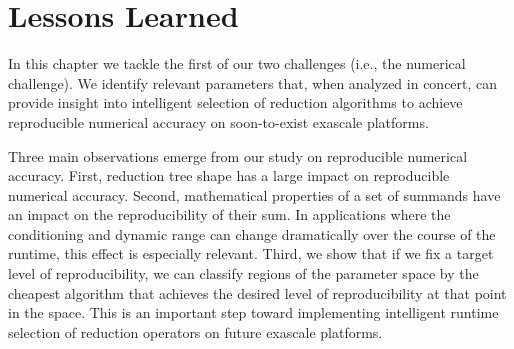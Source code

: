 \section{Lessons Learned}
\label{sec:conclusion}
In this chapter we tackle the first of our two challenges (i.e., the
numerical challenge). We identify relevant parameters that, when
analyzed in concert, can provide insight into intelligent selection of
reduction algorithms to achieve reproducible numerical accuracy on
soon-to-exist exascale platforms.

Three main observations emerge from our study on reproducible
numerical accuracy. First, reduction tree shape has a large impact on
reproducible numerical accuracy.  Second, mathematical properties of a
set of summands have an impact on the reproducibility of their sum. In
applications where the conditioning and dynamic range can change
dramatically over the course of the runtime, this effect is especially
relevant.  Third, we show that if we fix a target level of
reproducibility, we can classify regions of the parameter space by the
cheapest algorithm that achieves the desired level of reproducibility
at that point in the space. This is an important step toward
implementing intelligent runtime selection of reduction operators on
future exascale platforms.
